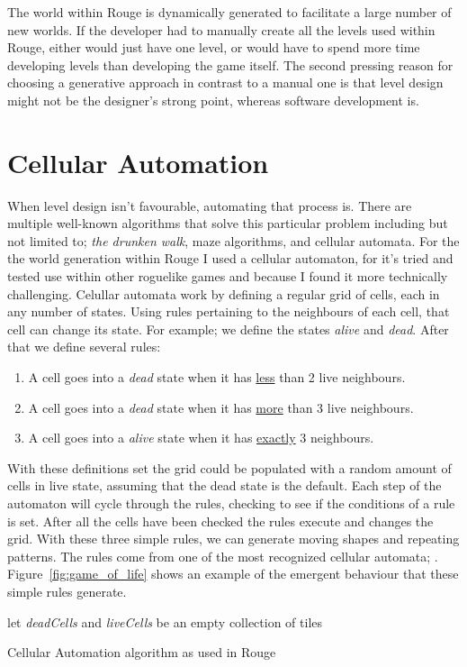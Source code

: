 The world within Rouge is dynamically generated to facilitate a large number of new worlds. If the developer had to manually create all the levels used within Rouge, either \he would just have one level, or \he would have to spend more time developing levels than developing the game itself. The second pressing reason for choosing a generative approach in contrast to a manual one is that level design might not be the designer's strong point, whereas software development is. 

\section{Cellular Automation}
When level design isn't favourable, automating that process is.
There are multiple well-known algorithms that solve this particular problem including but not limited to; \textit{the drunken walk}, maze algorithms, and cellular automata.
For the the world generation within Rouge I used a cellular automaton, for it's tried and tested use within other roguelike games and because I found it more technically challenging.
Celullar automata work by defining a regular grid of cells, each in any number of states. Using rules pertaining to the neighbours of each cell, that cell can change its state. For example; we define the states \textit{alive} and \textit{dead}. After that we define several rules:
\begin{enumerate}
	\item A cell goes into a \textit{dead} state when it has \underline{less} than 2 live neighbours.
	\item A cell goes into a \textit{dead} state when it has \underline{more} than 3 live neighbours.
	\item A cell goes into a \textit{alive} state when it has \underline{exactly} 3 neighbours.
\end{enumerate}
With these definitions set the grid could be populated with a random amount of cells in live state, assuming that the dead state is the default. Each step of the automaton will cycle through the rules, checking to see if the conditions of a rule is set. After all the cells have been checked the rules execute and changes the grid. With these three simple rules, we can generate moving shapes and repeating patterns. The rules come from one of the most recognized cellular automata; . Figure~\ref{fig:game_of_life} shows an example of the emergent behaviour that these simple rules generate.


\begin{algorithm}[h]
	let \textit{deadCells} and \textit{liveCells} be an empty collection of tiles\;
	\caption{Cellular Automation algorithm as used in Rouge}\label{alg:ca}
\end{algorithm}


